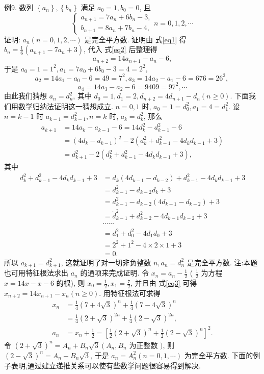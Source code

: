 例9. 数列 $\left\{a_n\right\},\left\{b_n\right\}$ 满足 $a_0=1, b_0=0$, 且
$$
\left\{\begin{array}{l}
a_{n+1}=7 a_n+6 b_n-3, \label{eq1}\\
b_{n+1}=8 a_n+7 b_n-4, \label{eq2}
\end{array} n=0,1,2, \cdots\right.
$$
证明: $a_n(n=0,1,2, \cdots)$ 是完全平方数.
证明由 式\ref{eq1} 得 $b_n=\frac{1}{6}\left(a_{n+1}-7 a_n+3\right)$, 代入 式\ref{eq2} 后整理得
$$
a_{n+2}=14 a_{n+1}-a_n-6, \label{eq3}
$$
于是 $a_0=1=1^2, a_1=7 a_0+6 b_0-3=4=2^2$,
$$
a_2=14 a_1-a_0-6=49=7^2, a_3=14 a_2-a_1-6=676=26^2 \text {, }
$$
$$
a_4=14 a_3-a_2-6=9409=97^2, \cdots
$$
由此我们猜想 $a_n=d_n^2$, 其中 $d_0=1, d_1=2, d_{n+2}=4 d_{n+1}-d_n(n \geqslant 0)$.
下面我们用数学归纳法证明这一猜想成立.
$n=0,1$ 时, $a_0=1=d_0^2, a_1=4=d_1^2$.
设 $n=k-1$ 时 $a_{k-1}=d_{k-1}^2, n=k$ 时, $a_k=d_k^2$, 那么
$$
\begin{aligned}
a_{k+1} & =14 a_k-a_{k-1}-6=14 d_k^2-d_{k-1}^2-6 \\
& =\left(4 d_k-d_{k-1}\right)^2-2\left(d_k^2+d_{k-1}^2-4 d_k d_{k-1}+3\right) \\
& =d_{k+1}^2-2\left(d_k^2+d_{k-1}^2-4 d_k d_{k-1}+3\right),
\end{aligned}
$$
其中
$$
\begin{aligned}
d_k^2+d_{k-1}^2-4 d_k d_{k-1}+3 & =d_k\left(4 d_{k-1}-d_{k-2}\right)+d_{k-1}^2-4 d_k d_{k-1}+3 \\
& =d_{k-1}^2-d_{k-2} d_k+3 \\
& =d_{k-1}^2-d_{k-2}\left(4 d_{k-1}-d_{k-2}\right)+3 \\
& =\dot{d}_{k-1}^2+d_{k-2}^2-4 d_{k-1} d_{k-2}+3 \\
& \cdots \cdots \\
& =d_1^2+d_0^2-4 d_1 d_0+3 \\
& =2^2+1^2-4 \times 2 \times 1+3 \\
& =0 .
\end{aligned}
$$
所以 $a_{k+1}=d_{k+1}^2$, 这就证明了对一切非负整数 $n, a_n=d_n^2$ 是完全平方数.
注:本题也可用特征根法求出 $a_n$ 的通项来完成证明.
令 $x_n=a_n-\frac{1}{2}$ ( $\frac{1}{2}$ 为方程 $x=14 x-x-6$ 的根), 则 $x_0=\frac{1}{2}, x_1=\frac{7}{2}$, 并且由 式\ref{eq3} 可得 $x_{n+2}=14 x_{n+1}-x_n(n \geqslant 0)$. 用特征根法可求得
$$
\begin{aligned}
x_n & =\frac{1}{4}(7+4 \sqrt{3})^n+\frac{1}{4}(7-4 \sqrt{3})^n \\
& =\frac{1}{4}(2+\sqrt{3})^{2 n}+\frac{1}{4}(2-\sqrt{3})^{2 n}, \\
a_n & =x_n+\frac{1}{2}=\left[\frac{1}{2}(2+\sqrt{3})^n+\frac{1}{2}(2-\sqrt{3})^n\right]^2 .
\end{aligned}
$$
令 $(2+\sqrt{3})^n=A_n+B_n \sqrt{3}\left(A_n, B_n\right.$ 为正整数 $)$, 则 $(2-\sqrt{3})^n=A_n-B_n \sqrt{3}$, 于是 $a_n=A_n^2(n=0,1, \cdots)$ 为完全平方数.
下面的例子表明,通过建立递推关系可以使有些数学问题很容易得到解决.



